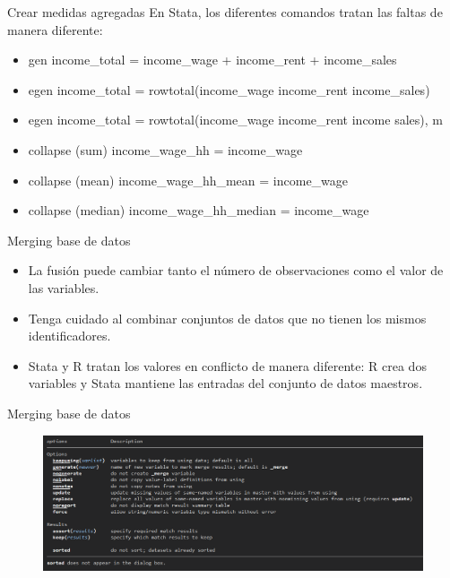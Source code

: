 \documentclass[10pt, aspectratio=169, compress]{beamer}
\begin{document}
\begin{frame}{Crear medidas agregadas}
	En Stata, los diferentes comandos tratan las faltas de manera diferente:
	\begin{itemize}
		\item gen income\_total = income\_wage + income\_rent + income\_sales
		\item egen income\_total = rowtotal(income\_wage income\_rent income\_sales)
		\item egen income\_total = rowtotal(income\_wage income\_rent
		income sales), m
		\item collapse (sum) income\_wage\_hh = income\_wage
		\item collapse (mean) income\_wage\_hh\_mean = income\_wage
		\item collapse (median) income\_wage\_hh\_median = income\_wage
	\end{itemize}
\end{frame}
\begin{frame}{Merging base de datos}
	\begin{itemize}
		\item La fusión puede cambiar tanto el número de observaciones como el valor de las variables.
		\item Tenga cuidado al combinar conjuntos de datos que no tienen los mismos identificadores.
		\item Stata y R tratan los valores en conflicto de manera diferente: R crea dos variables y Stata mantiene las entradas del conjunto de datos maestros.
	\end{itemize}
\end{frame}
\begin{frame}{Merging base de datos}
	\begin{figure}[H]
		\centering
		\includegraphics[width=1\textwidth]{merge.png}
	\end{figure}
\end{frame}
\end{document}
